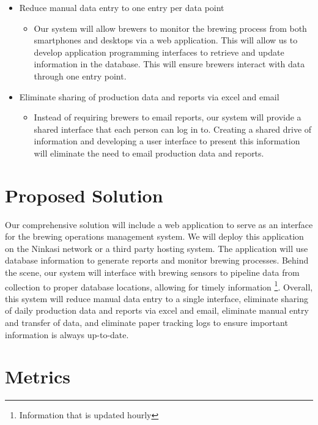 \documentclass[draftclsnofoot,onecolumn,letterpaper,10pt]{IEEEtran}
\begin{document}
\begin{itemize}
	\item {Reduce manual data entry to one entry per data point}
	\begin{itemize}
		\item {
			Our system will allow brewers to monitor the brewing process from both smartphones and desktops via a web application.
			This will allow us to develop application programming interfaces to retrieve and update information in the database.
			This will ensure brewers interact with data through one entry point.
		}
	\end{itemize}

	\item {Eliminate sharing of production data and reports via excel and email}
  \begin{itemize}
		\item {
			Instead of requiring brewers to email reports, our system will provide a shared interface that each person can log in to.
			Creating a shared drive of information and developing a user interface to present this information will eliminate the need to email production data and reports.
		}
	\end{itemize}
\end{itemize}

\section{Proposed Solution}
Our comprehensive solution will include a web application to serve as an interface for the brewing operations management system.
We will deploy this application on the Ninkasi network or a third party hosting system.
The application will use database information to generate reports and monitor brewing processes.
Behind the scene, our system will interface with brewing sensors to pipeline data from collection to proper database locations, allowing for timely information \footnote{Information that is updated hourly}.
Overall, this system will reduce manual data entry to a single interface, eliminate sharing of daily production data and reports via excel and email, eliminate manual entry and transfer of data, and eliminate paper tracking logs to ensure important information is always up-to-date.

\section{Metrics}
\end{document}
